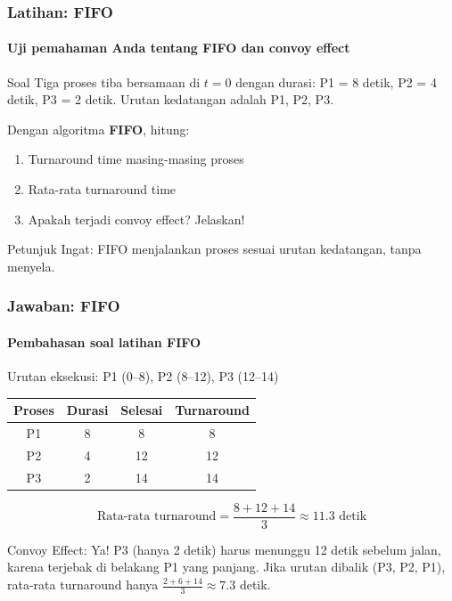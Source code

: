 \documentclass[t,aspectratio=169,xcolor=dvipsnames]{beamer}
\begin{document}
\begin{frame}
    \frametitle{Latihan: FIFO}
    \framesubtitle{Uji pemahaman Anda tentang FIFO dan convoy effect}
    \small
    \begin{block}{Soal}
        Tiga proses tiba bersamaan di $t=0$ dengan durasi: P1 = 8 detik, P2 = 4 detik, P3 = 2 detik. Urutan kedatangan adalah P1, P2, P3.

        \vspace{0.1cm}
        Dengan algoritma \textbf{FIFO}, hitung:
        \begin{enumerate}
            \item Turnaround time masing-masing proses
            \item Rata-rata turnaround time
            \item Apakah terjadi convoy effect? Jelaskan!
        \end{enumerate}
    \end{block}
    \begin{exampleblock}{Petunjuk}
        Ingat: FIFO menjalankan proses sesuai urutan kedatangan, tanpa menyela.
    \end{exampleblock}
\end{frame}

\begin{frame}
    \frametitle{Jawaban: FIFO}
    \framesubtitle{Pembahasan soal latihan FIFO}
    \small
    Urutan eksekusi: P1 (0--8), P2 (8--12), P3 (12--14)

    \vspace{0.1cm}
    \begin{tabular}{|c|c|c|c|}
        \hline
        \textbf{Proses} & \textbf{Durasi} & \textbf{Selesai} & \textbf{Turnaround} \\
        \hline
        P1 & 8 & 8 & 8 \\
        \hline
        P2 & 4 & 12 & 12 \\
        \hline
        P3 & 2 & 14 & 14 \\
        \hline
    \end{tabular}

    \vspace{0.1cm}
    $$\text{Rata-rata turnaround} = \frac{8+12+14}{3} \approx 11.3 \text{ detik}$$

    \begin{alertblock}{Convoy Effect: Ya!}
        P3 (hanya 2 detik) harus menunggu 12 detik sebelum jalan, karena terjebak di belakang P1 yang panjang. Jika urutan dibalik (P3, P2, P1), rata-rata turnaround hanya $\frac{2+6+14}{3} \approx 7.3$ detik.
    \end{alertblock}
\end{frame}
\end{document}
